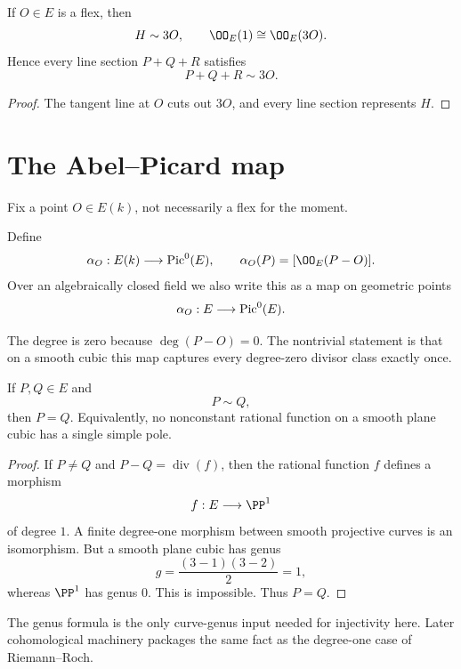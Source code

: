 \begin{proposition}\label{prop:vi43-flex-hyperplane}
If \(O\in E\) is a flex, then
\[
  H\sim3O,
  \qquad
  \OO_E(1)\cong\OO_E(3O).
\]
Hence every line section \(P+Q+R\) satisfies
\[
  \boxed{P+Q+R\sim3O.}
\]
\end{proposition}

\begin{proof}
The tangent line at \(O\) cuts out \(3O\), and every line section represents \(H\).
\end{proof}



\section{The Abel--Picard map}

Fix a point \(O\in E(k)\), not necessarily a flex for the moment.

\begin{definition}\label{def:vi43-abel-picard}
Define
\[
  \alpha_O:E(k)\longrightarrow\Pic^0(E),
  \qquad
  \alpha_O(P)=[\OO_E(P-O)].
\]
Over an algebraically closed field we also write this as a map on geometric points
\[
  \alpha_O:E\longrightarrow\operatorname{Pic}^0(E).
\]
\end{definition}

The degree is zero because \(\deg(P-O)=0\).  The nontrivial statement is that on a smooth cubic this map captures every degree-zero divisor class exactly once.

\begin{theorem}\label{thm:vi43-degree-one-rigidity}
If \(P,Q\in E\) and
\[
  P\sim Q,
\]
then \(P=Q\).  Equivalently, no nonconstant rational function on a smooth plane cubic has a single simple pole.
\end{theorem}

\begin{proof}
If \(P\neq Q\) and \(P-Q=\operatorname{div}(f)\), then the rational function \(f\) defines a morphism
\[
  f:E\longrightarrow\PP^1
\]
of degree \(1\).  A finite degree-one morphism between smooth projective curves is an isomorphism.  But a smooth plane cubic has genus
\[
  g=\frac{(3-1)(3-2)}2=1,
\]
whereas \(\PP^1\) has genus \(0\).  This is impossible.  Thus \(P=Q\).
\end{proof}

The genus formula is the only curve-genus input needed for injectivity here.  Later cohomological machinery packages the same fact as the degree-one case of Riemann--Roch.

